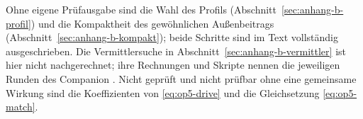 Ohne eigene Prüfausgabe sind die Wahl des Profils (Abschnitt~\ref{sec:anhang-b-profil}) und die Kompaktheit des gewöhnlichen Außenbeitrags
(Abschnitt~\ref{sec:anhang-b-kompakt}); beide Schritte sind im Text vollständig ausgeschrieben. Die Vermittlersuche in
Abschnitt~\ref{sec:anhang-b-vermittler} ist hier nicht nachgerechnet; ihre Rechnungen und Skripte nennen die jeweiligen Runden des
Companion \cite{layers}. Nicht geprüft und nicht prüfbar ohne eine gemeinsame Wirkung sind die Koeffizienten von
\eqref{eq:op5-drive} und die Gleichsetzung \eqref{eq:op5-match}.

